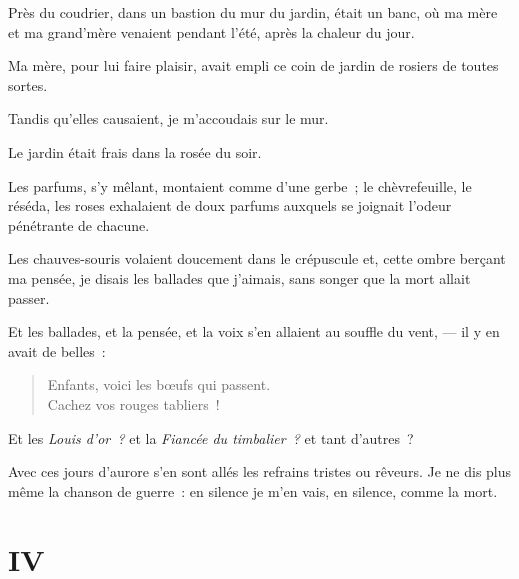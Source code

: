 \documentclass[french,twoside]{book} %
\newcommand\chapteropen{} %
\newcommand\chapterclose{} %
\begin{document}
Près du coudrier, dans un bastion du mur du jardin, était un banc, où ma mère et ma grand’mère venaient pendant l’été, après la chaleur du jour.\par
Ma mère, pour lui faire plaisir, avait empli ce coin de jardin de rosiers de toutes sortes.\par
Tandis qu’elles causaient, je m’accoudais sur le mur.\par
Le jardin était frais dans la rosée du soir.\par
Les parfums, s’y mêlant, montaient comme d’une gerbe ; le chèvrefeuille, le réséda, les roses exhalaient de doux parfums auxquels se joignait l’odeur pénétrante de chacune.\par
Les chauves-souris volaient doucement dans le crépuscule et, cette ombre berçant ma pensée, je disais les ballades que j’aimais, sans songer que la mort allait passer.\par
Et les ballades, et la pensée, et la voix s’en allaient au souffle du vent, — il y en avait de belles :\par
 

\begin{verse}
Enfants, voici les bœufs qui passent.\\
Cachez vos rouges tabliers !\\
\end{verse}

\noindent Et les \emph{Louis d’or ?} et la \emph{Fiancée du timbalier ?} et tant d’autres ?\par
Avec ces jours d’aurore s’en sont allés les refrains tristes ou rêveurs. Je ne dis plus même la chanson de guerre : en silence je m’en vais, en silence, comme la mort.
\chapterclose


\chapteropen
 \chapter[{IV}]{IV}
\label{p1.4}
\end{document}
